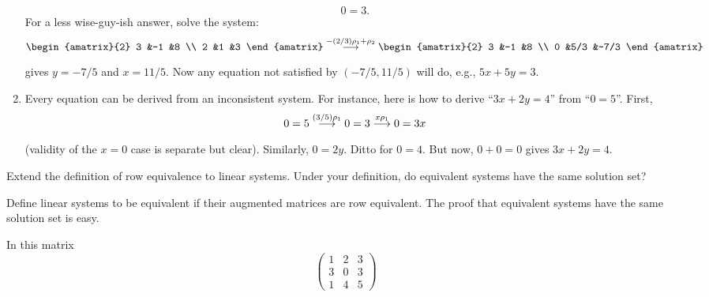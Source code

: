 \begin{exercises}
\begin{answer}
\begin{enumerate}
\begin{equation*}
            0=3.
          \end{equation*}
          For a less wise-guy-ish answer, solve the system:
          \begin{equation*}
            \begin{amatrix}{2}
              3  &-1  &8  \\
              2  &1   &3
            \end{amatrix}
            \grstep{-(2/3)\rho_1+\rho_2}
            \begin{amatrix}{2}
              3  &-1  &8    \\
              0  &5/3 &-7/3
            \end{amatrix}
          \end{equation*}
          gives \( y=-7/5 \) and \( x=11/5 \).
          Now any equation not satisfied by \( (-7/5,11/5) \) will do,
          e.g., \( 5x+5y=3 \).
        \item Every equation can be derived from an inconsistent system.
          For instance, here is how to derive ``\( 3x+2y=4 \)'' from
          ``\( 0=5 \)''.
          First,
          \begin{equation*}
            0=5
            \mathrel{ \mathop{\longrightarrow}\limits^{(3/5)\rho_1\mathstrut}_{ \begin{subarray}{l} \relax \end{subarray}}}
            0=3
            \mathrel{ \mathop{\longrightarrow}\limits^{x\rho_1\mathstrut}_{ \begin{subarray}{l} \relax \end{subarray}}}
            0=3x
          \end{equation*}
          (validity of the \( x=0 \) case is separate but clear).
          Similarly, \( 0=2y \).
          Ditto for \( 0=4 \).
          But now, \( 0+0=0 \) gives \( 3x+2y=4 \).
     \end{enumerate}  
    \end{answer}
  \item 
    Extend the definition of row equivalence to linear systems.
    Under your definition, do equivalent systems have the same solution set?
    \cite{HoffmanKunze}
    \begin{answer}
      Define linear systems to be equivalent if their augmented
      matrices are row equivalent.
      The proof that equivalent systems have the same solution set is easy.  
    \end{answer}
  \recommended \item 
    In this matrix
    \begin{equation*}
      \begin{pmatrix}
        1  &2  &3  \\
        3  &0  &3  \\
        1  &4  &5
      \end{pmatrix}

\end{equation*}
\end{exercises}
